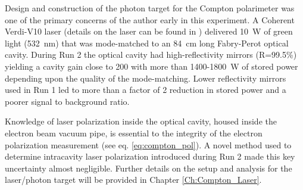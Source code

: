 Design and construction of the photon target for the Compton polarimeter was one of the primary concerns of the author early in this experiment. A Coherent Verdi-V10 laser (details on the laser can be found in \cite{Verdi10}) delivered 10~W of green light (532~nm) that was mode-matched to an 84~cm long Fabry-Perot optical cavity. During Run 2 the optical cavity had high-reflectivity mirrors (R=99.5\%) yielding a cavity gain close to 200 with more than 1400-1800~W of stored power depending upon the quality of the mode-matching. Lower reflectivity mirrors used in Run 1 led to more than a factor of 2 reduction in stored power and a poorer signal to background ratio. 

Knowledge of laser polarization inside the optical cavity, housed inside the electron beam vacuum pipe, is essential to the integrity of the electron polarization measurement (see eq. \ref{eq:compton_pol}). A novel method used to determine intracavity laser polarization introduced during Run 2 made this key uncertainty almost negligible. Further details on the setup and analysis for the laser/photon target will be provided in Chapter \ref{Ch:Compton_Laser}.

